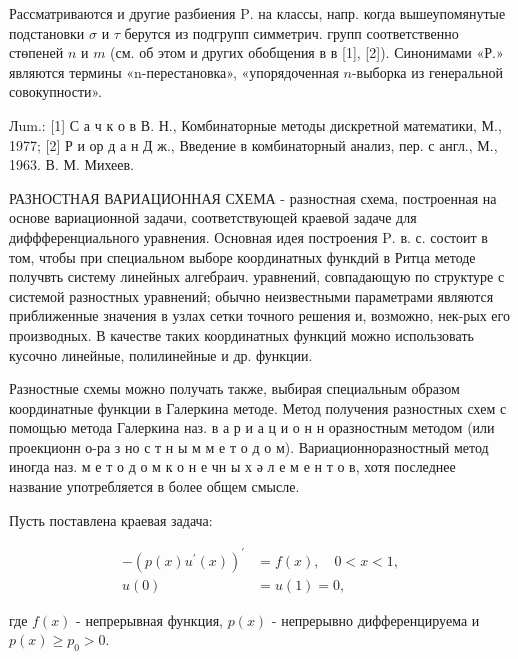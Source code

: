 \documentclass[10pt]{article}
\begin{document}
Рассматриваются и другие разбиения $\mathrm{P}$. на классы, напр. когда вышеупомянутые подстановки $\sigma$ и $\tau$ берутся из подгрупп симметрич. групп соответственно стөпеней $n$ и $m$ (см. об этом и других обобщения в в [1], [2]). Синонимами «Р.» являются термины «n-перестановка», «упорядоченная $n$-выборка из генеральной совокупности».



Лum.: [1] С а ч к о в В. Н., Комбинаторные методы дискретной математики, М., 1977; [2] Р и ор д а н Д ж., Введение в комбинаторный анализ, пер. с англ., М., 1963. В. М. Михеев.



РАЗНОСТНАЯ ВАРИАЦИОННАЯ СХЕМА - разностная схема, построенная на основе вариационной задачи, соответствующей краевой задаче для диффференциального уравнения. Основная идея построения $\mathrm{P}$. в. с. состоит в том, чтобы при специальном выборе координатных функдий в Ритца методе получвть систему линейных алгебраич. уравнений, совпадающую по структуре с системой разностных уравнений; обычно неизвестными параметрами являются приближенные значения в узлах сетки точного решения и, возможно, нек-рых его производных. В качестве таких координатных функций можно использовать кусочно линейные, полилинейные и др. функции.



Разностные схемы можно получать также, выбирая специальным образом координатные функции в Галеркина методе. Метод получения разностных схем с помощью метода Галеркина наз. в а р и а ц и о н н оразностным методом (или проекционн о-ра з но с т н ы м м е т о д о м). Вариационноразностный метод иногда наз. м е т о д о м к о н е чн ы х ә л е м е н т о в, хотя последнее название употребляется в более общем смысле.



Пусть поставлена краевая задача:



\[

\begin{aligned}

-\left(p(x) u^{\prime}(x)\right)^{\prime} & =f(x), \quad 0<x<1, \\

u(0) & =u(1)=0,

\end{aligned}

\]



где $f(x)$ - непрерывная функция, $p(x)$ - непрерывно дифференцируема и $p(x) \geqslant p_{0}>0$.
\end{document}
